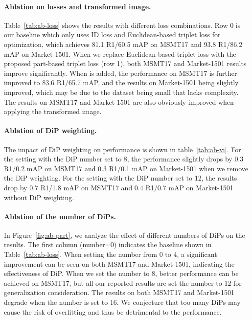 \documentclass[10pt,twocolumn,letterpaper]{article}
\begin{document}
\vspace{-0.4cm}
\paragraph{Ablation on losses and transformed image.}
Table~\ref{tab:ab-loss} shows the results with different loss combinations. Row 0 is our baseline which only uses ID loss and Euclidean-based triplet loss for optimization, which achieves 81.1 R1/60.5 mAP on MSMT17 and 93.8 R1/86.2 mAP on Market-1501. When we replace Euclidean-based triplet loss with the proposed part-based triplet loss (row 1), both MSMT17 and Market-1501 results improve significantly. 
When  is added, the performance on MSMT17 is further improved to 83.6 R1/65.7 mAP, and the results on Market-1501 being slightly improved, which may be due to the dataset being small that lacks complexity. The results on MSMT17 and Market-1501 are also obviously improved when applying the transformed image.

\vspace{-0.4cm}
\paragraph{Ablation of DiP weighting.}
The impact of DiP weighting on performance is shown in table~\ref{tab:ab-vi}. For the setting with the DiP number set to 8, the performance slightly drops by 0.3 R1/0.2 mAP on MSMT17 and 0.3 R1/0.1 mAP on Market-1501 when we remove the DiP weighting.
For the setting with the DiP number set to 12, the results drop by 0.7 R1/1.8 mAP on MSMT17 and 0.4 R1/0.7 mAP on Market-1501 without DiP weighting.


\vspace{-0.4cm}
\paragraph{Ablation of the number of DiPs.}
In Figure~\ref{fig:ab-part}, we analyze the effect of different numbers of DiPs on the results. The first column (number=0) indicates the baseline shown in Table~\ref{tab:ab-loss}. When setting the number from 0 to 4, a significant improvement can be seen on both MSMT17 and Market-1501, indicating the effectiveness of DiP. When we set the number to 8, better performance can be achieved on MSMT17, but all our reported  results are set the number to 12 for generalization consideration. The results on both MSMT17 and Market-1501 degrade when the number is set to 16. We conjecture that too many DiPs may cause the risk of overfitting and thus be detrimental to the performance.
\end{document}
